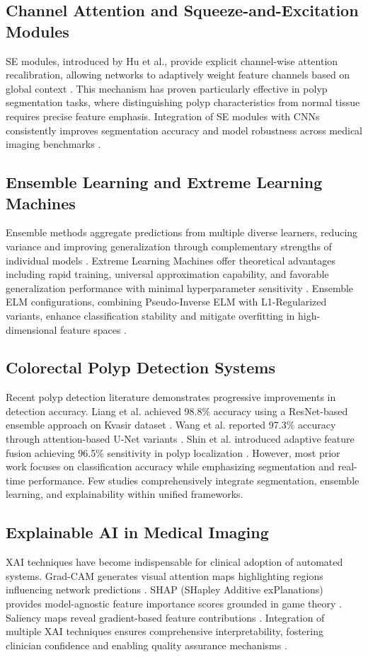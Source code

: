 \documentclass[11pt,a4paper]{article}
\begin{document}
\subsection{Channel Attention and Squeeze-and-Excitation Modules}
SE modules, introduced by Hu et al., provide explicit channel-wise attention recalibration, allowing networks to adaptively weight feature channels based on global context \cite{ref7}. This mechanism has proven particularly effective in polyp segmentation tasks, where distinguishing polyp characteristics from normal tissue requires precise feature emphasis. Integration of SE modules with CNNs consistently improves segmentation accuracy and model robustness across medical imaging benchmarks \cite{ref18}.

\subsection{Ensemble Learning and Extreme Learning Machines}
Ensemble methods aggregate predictions from multiple diverse learners, reducing variance and improving generalization through complementary strengths of individual models \cite{ref19}. Extreme Learning Machines offer theoretical advantages including rapid training, universal approximation capability, and favorable generalization performance with minimal hyperparameter sensitivity \cite{ref20}. Ensemble ELM configurations, combining Pseudo-Inverse ELM with L1-Regularized variants, enhance classification stability and mitigate overfitting in high-dimensional feature spaces \cite{ref21}.

\subsection{Colorectal Polyp Detection Systems}
Recent polyp detection literature demonstrates progressive improvements in detection accuracy. Liang et al. achieved 98.8\% accuracy using a ResNet-based ensemble approach on Kvasir dataset \cite{ref22}. Wang et al. reported 97.3\% accuracy through attention-based U-Net variants \cite{ref23}. Shin et al. introduced adaptive feature fusion achieving 96.5\% sensitivity in polyp localization \cite{ref24}. However, most prior work focuses on classification accuracy while emphasizing segmentation and real-time performance. Few studies comprehensively integrate segmentation, ensemble learning, and explainability within unified frameworks.

\subsection{Explainable AI in Medical Imaging}
XAI techniques have become indispensable for clinical adoption of automated systems. Grad-CAM generates visual attention maps highlighting regions influencing network predictions \cite{ref25}. SHAP (SHapley Additive exPlanations) provides model-agnostic feature importance scores grounded in game theory \cite{ref26}. Saliency maps reveal gradient-based feature contributions \cite{ref27}. Integration of multiple XAI techniques ensures comprehensive interpretability, fostering clinician confidence and enabling quality assurance mechanisms \cite{ref28}.
\end{document}

